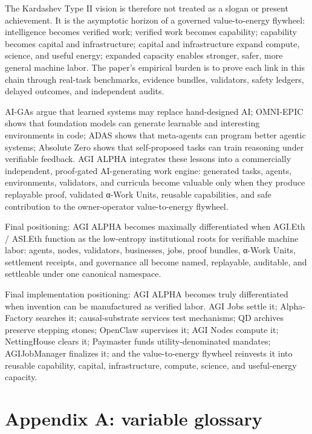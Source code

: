 The Kardashev Type II vision is therefore not treated as a slogan or
present achievement. It is the asymptotic horizon of a governed
value-to-energy flywheel: intelligence becomes verified work; verified
work becomes capability; capability becomes capital and infrastructure;
capital and infrastructure expand compute, science, and useful energy;
expanded capacity enables stronger, safer, more general machine labor.
The paper's empirical burden is to prove each link in this chain through
real-task benchmarks, evidence bundles, validators, safety ledgers,
delayed outcomes, and independent audits.

AI-GAs argue that learned systems may replace hand-designed AI;
OMNI-EPIC shows that foundation models can generate learnable and
interesting environments in code; ADAS shows that meta-agents can
program better agentic systems; Absolute Zero shows that self-proposed
tasks can train reasoning under verifiable feedback. AGI ALPHA
integrates these lessons into a commercially independent, proof-gated
AI-generating work engine: generated tasks, agents, environments,
validators, and curricula become valuable only when they produce
replayable proof, validated α-Work Units, reusable capabilities, and
safe contribution to the owner-operator value-to-energy flywheel.

Final positioning: AGI ALPHA becomes maximally differentiated when
AGI.Eth / ASI.Eth function as the low-entropy institutional roots for
verifiable machine labor: agents, nodes, validators, businesses, jobs,
proof bundles, α-Work Units, settlement receipts, and governance all
become named, replayable, auditable, and settleable under one canonical
namespace.

Final implementation positioning: AGI ALPHA becomes truly differentiated
when invention can be manufactured as verified labor. AGI Jobs settle
it; Alpha-Factory searches it; causal-substrate services test
mechanisms; QD archives preserve stepping stones; OpenClaw supervises
it; AGI Nodes compute it; NettingHouse clears it; Paymaster funds
utility-denominated mandates; AGIJobManager finalizes it; and the
value-to-energy flywheel reinvests it into reusable capability, capital,
infrastructure, compute, science, and useful-energy capacity.

\section{Appendix A: variable
glossary}\label{appendix-a-variable-glossary}

